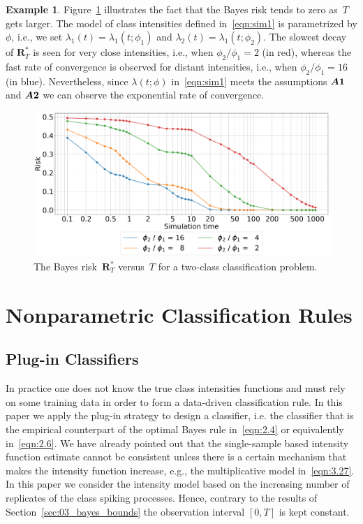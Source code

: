 \documentclass[lettersize,journal,onecolumn]{IEEEtran}
\theoremstyle{definition}
\newtheorem{example}{Example}
\newcommand{\figurewidth}{0.5\columnwidth}  %
\newcommand{\assumption}[1]{{\rm \boldsymbol{A#1}}}
\begin{document}
\begin{example}
	Figure~\ref{fig:03_bayes_bounds/risk/simulations} illustrates the fact that 
	the Bayes risk tends to zero as~$T$ gets larger. The model of class intensities  
	defined in~\eqref{eqn:sim1} is parametrized by $\phi$, i.e., we set 
	\mbox{$\lambda_{1}(t)=\lambda_{1}(t;\phi_{1})$} and 
	\mbox{$\lambda_{2}(t)=\lambda_{1}(t;\phi_{2})$}. The slowest decay of 
	$\mathbf{R}_T^{*}$ is seen for very close intensities, i.e., when
	\mbox{$\phi_{2}/\phi_{1}=2$}
	(in red), whereas the fast rate of convergence is observed for distant intensities,
	i.e., when
	\mbox{$\phi_{2}/\phi_{1}=16$} (in blue). Nevertheless, since $\lambda(t;\phi)$ 
	in~\eqref{eqn:sim1} meets the assumptions $\assumption{1}$ and $\assumption{2}$ 
	we can observe the exponential rate of convergence.
	\begin{figure}[!t]
		\includegraphics[width=\figurewidth]{pawla2}
		\centering
		\caption{The Bayes risk~$\mathbf{R}^{*}_{T}$ versus~$T$ for a two-class 
			classification problem.}
		\label{fig:03_bayes_bounds/risk/simulations}
	\end{figure}
\end{example}

\section{Nonparametric Classification Rules}
\label{sec:04_nonparametric}

\subsection{Plug-in Classifiers}
\label{subsec:04_nonparametric/plug-in}

\noindent In practice one does not know the true class intensities functions and must rely 
on some training data in order to form a data-driven classification rule. In this paper we
apply the plug-in strategy to design a classifier, i.e. the classifier that is the 
empirical counterpart of the optimal Bayes rule in~\eqref{eqn:2.4} 
or equivalently in~\eqref{eqn:2.6}.
We have already pointed out that the single-sample 
based intensity function estimate cannot be consistent unless there is a certain 
mechanism that makes the intensity function increase, e.g., the multiplicative model
in~\eqref{eqn:3.27}. In this paper we consider the intensity model based on the
increasing number of replicates of the class spiking processes. Hence, contrary to the
results of Section~\ref{sec:03_bayes_bounds} the observation interval $[0,T]$ is kept
constant.
\end{document}
